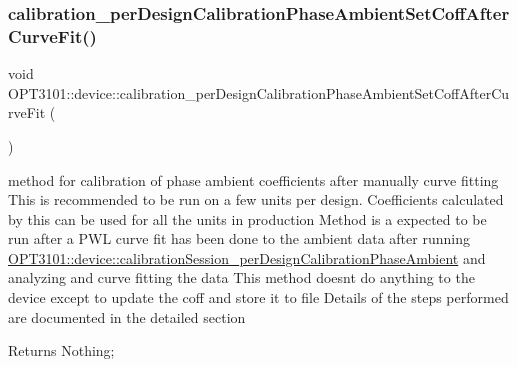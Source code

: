 \subsubsection{\texorpdfstring{calibration\+\_\+per\+Design\+Calibration\+Phase\+Ambient\+Set\+Coff\+After\+Curve\+Fit()}{calibration\_perDesignCalibrationPhaseAmbientSetCoffAfterCurveFit()}}
{\footnotesize\ttfamily void O\+P\+T3101\+::device\+::calibration\+\_\+per\+Design\+Calibration\+Phase\+Ambient\+Set\+Coff\+After\+Curve\+Fit (\begin{DoxyParamCaption}{ }\end{DoxyParamCaption})}



method for calibration of phase ambient coefficients after manually curve fitting This is recommended to be run on a few units per design. Coefficients calculated by this can be used for all the units in production Method is a expected to be run after a P\+WL curve fit has been done to the ambient data after running \mbox{\hyperlink{class_o_p_t3101_1_1device_a94c4e35aa43bc53eb8fe0d4c364aea25}{O\+P\+T3101\+::device\+::calibration\+Session\+\_\+per\+Design\+Calibration\+Phase\+Ambient}} and analyzing and curve fitting the data This method doesn\textquotesingle{}t do anything to the device except to update the coff and store it to file Details of the steps performed are documented in the detailed section 

\begin{DoxyReturn}{Returns}
Nothing; 
\end{DoxyReturn}

